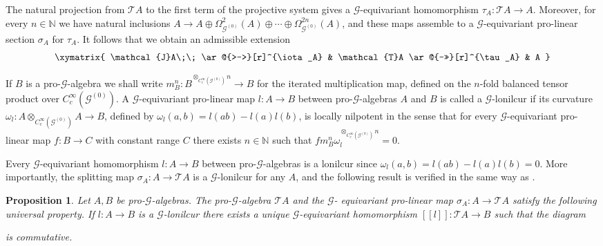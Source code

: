\documentclass{amsart}
\newtheorem{prop}[thm]{Proposition}
\newcommand{\G}{\mathcal{G}}
\newcommand{\J}{\mathcal{J}}
\newcommand{\T}{\mathcal{T}}
\newcommand{\ccinfty}{C_c^\infty}
\begin{document}
The natural projection from $ \T A$ to the first term of the projective system gives a $ \G $-equivariant homomorphism $ \tau_A: \T A \rightarrow A $. Moreover, for 
every $ n \in \mathbb{N} $ we have natural inclusions $ A \rightarrow A \oplus \Omega_{\G^{(0)}}^2(A) \oplus \cdots \oplus \Omega_{\G^{(0)}}^{2 n}(A) $, and these maps 
assemble to a $ \G $-equivariant pro-linear section $ \sigma_A $ for $ \tau_A $.
It follows that we obtain an admissible extension
\begin{equation*} \label{eqext}
   \xymatrix{
     \J A\;\; \ar@{>->}[r]^{\iota_A} & \T A \ar@{->>}[r]^{\tau_A} & A 
     }
\end{equation*}

If $ B $ is a pro-$ \G $-algebra we shall write $ m^n_B: B^{\otimes_{\ccinfty(\G^{(0)})} n} \rightarrow B $ for the iterated multiplication map, defined on the $ n $-fold balanced tensor product over $ \ccinfty(\G^{(0)}) $. 
A $ \G $-equivariant pro-linear map $ l: A \rightarrow B $ between pro-$ \G $-algebras $ A $ and $ B $ is called a $ \G $-lonilcur if its curvature $ \omega_l: A \otimes_{\ccinfty(\G^{(0)})} A \rightarrow B $, defined by $ \omega_l(a, b) = l(a b) - l(a) l(b) $, is locally nilpotent in the sense that for every $ \G $-equivariant pro-linear map $ f: B \rightarrow C $ with constant range $ C $ there exists $ n \in \mathbb{N} $ such that $ f m_B^n \omega_l^{\otimes_{\ccinfty(\G^{(0)})} n} = 0 $.

Every $ \G $-equivariant homomorphism $ l: A \rightarrow B $ between pro-$ \G $-algebras is a lonilcur since $ \omega_l(a, b) = l(a b) - l(a) l(b) = 0 $. 
More importantly, the splitting map $ \sigma_A: A \rightarrow \T A$ is a $ \G $-lonilcur for any $ A $, and the following result is verified in the same way as \cite[Proposition 3.3]{VOIGT_thesis}. 

\begin{prop} \label{prop: universal property of tensor algebra}
Let $ A,B $ be pro-$ \G $-algebras. The pro-$ \G $-algebra $ \T A $ and the $ \G $- equivariant pro-linear map $ \sigma_A: A \rightarrow \T A $ satisfy the following universal property. If $ l: A \rightarrow B $ is a $ \G $-lonilcur there exists a unique $ \G $-equivariant homomorphism $ [[l]]: \T A \rightarrow B $ such that the diagram
\begin{center}
\end{center}
is commutative.
\end{prop}
\end{document}
